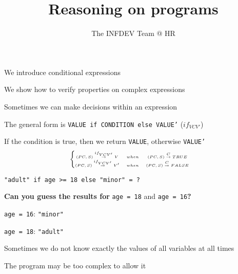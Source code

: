 \documentclass{beamer}
\title{Reasoning on programs}
\author{The INFDEV Team @ HR}
\institute{Hogeschool Rotterdam \\ 
Rotterdam, Netherlands}
\date{}
\begin{document}
\maketitle

\begin{slide}{
\item We introduce conditional expressions
\item We show how to verify properties on complex expressions
}\end{slide}

\begin{slide}{
\item Sometimes we can make decisions within an expression
\item The general form is \texttt{VALUE if CONDITION else VALUE'} ($if_{VCV'}$)
\item If the condition is true, then we return \texttt{VALUE}, otherwise \texttt{VALUE'}
$$
\tiny
\left\{
\begin{matrix}
(PC,S) \overset{if_{VCV'}}{\rightarrow} V &when& (PC,S) \overset{C}{\rightarrow} TRUE & \\
(PC,S) \overset{if_{VCV'}}{\rightarrow} V' &when& (PC,S) \overset{C}{\rightarrow} FALSE & \\
\end{matrix}
\right.
$$
}\end{slide}

\begin{slide}{
\item \texttt{"adult" if age >= 18 else "minor" = ?}
\item \textbf{Can you guess the results for} \texttt{age = 18} and \texttt{age = 16}\textbf{?}
\pause
\item \texttt{age = 16}: \texttt{"minor"}
\item \texttt{age = 18}: \texttt{"adult"}
}\end{slide}

\begin{slide}{
\item Sometimes we do not know exactly the values of all variables at all times
\item The program may be too complex to allow it
}\end{slide}
\end{document}
